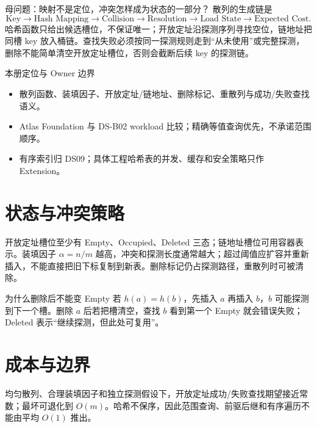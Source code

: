 \documentclass[UTF8,fontset=none,11pt,a4paper]{ctexart}
\begin{document}

\begin{corebox}{母问题：映射不是定位，冲突怎样成为状态的一部分？}
散列的生成链是
\[
\text{Key}\to\text{Hash Mapping}\to\text{Collision}\to\text{Resolution}\to\text{Load State}\to\text{Expected Cost}.
\]
哈希函数只给出候选槽位，不保证唯一；开放定址沿探测序列寻找空位，链地址把同槽 key 放入桶链。查找失败必须按同一探测规则走到“从未使用”或完整探测，删除不能简单清空开放定址槽位，否则会截断后续 key 的探测链。
\end{corebox}
\begin{methodbox}{本册定位与 Owner 边界}
\begin{itemize}
\item {}散列函数、装填因子、开放定址/链地址、删除标记、重散列与成功/失败查找语义。
\item {}Atlas Foundation 与 DS-B02 workload 比较；精确等值查询优先，不承诺范围顺序。
\item {}有序索引归 DS09；具体工程哈希表的并发、缓存和安全策略只作 Extension。
\end{itemize}
\end{methodbox}
\tableofcontents\newpage

\section{状态与冲突策略}
开放定址槽位至少有 Empty、Occupied、Deleted 三态；链地址槽位可用容器表示。装填因子 $\alpha=n/m$ 越高，冲突和探测长度通常越大；超过阈值应扩容并重新插入，不能直接把旧下标复制到新表。删除标记仍占探测路径，重散列时可被清除。
\begin{examplebox}{为什么删除后不能变 Empty}
若 $h(a)=h(b)$，先插入 $a$ 再插入 $b$，$b$ 可能探测到下一个槽。删除 $a$ 后若把槽清空，查找 $b$ 看到第一个 Empty 就会错误失败；Deleted 表示“继续探测，但此处可复用”。
\end{examplebox}

\section{成本与边界}
均匀散列、合理装填因子和独立探测假设下，开放定址成功/失败查找期望接近常数；最坏可退化到 $O(m)$。哈希不保序，因此范围查询、前驱后继和有序遍历不能由平均 $O(1)$ 推出。
\end{document}
